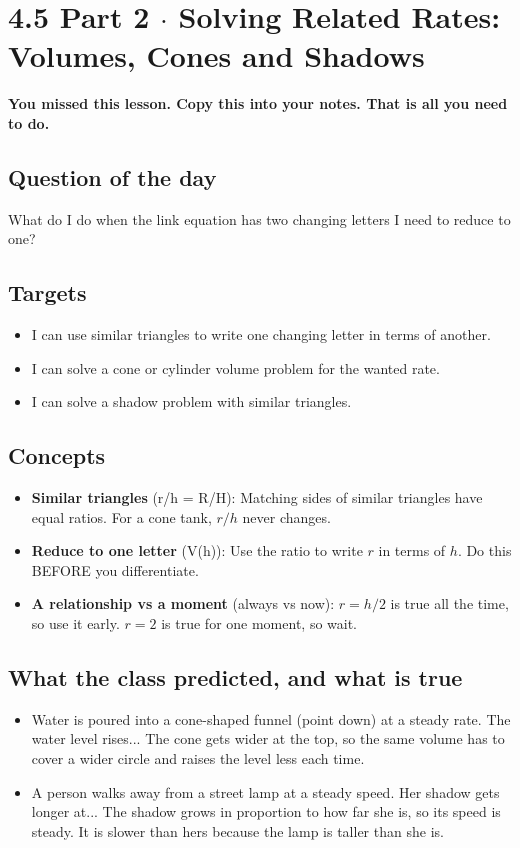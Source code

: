 \documentclass[11pt]{article}
\begin{document}
\section*{4.5 Part 2 $\cdot$ Solving Related Rates: Volumes, Cones and Shadows}
\textbf{You missed this lesson. Copy this into your notes. That is all you need to do.}\par\medskip
\subsection*{Question of the day}
What do I do when the link equation has two changing letters I need to reduce to one?\par
\subsection*{Targets}\begin{itemize}\item I can use similar triangles to write one changing letter in terms of another.
\item I can solve a cone or cylinder volume problem for the wanted rate.
\item I can solve a shadow problem with similar triangles.\end{itemize}
\subsection*{Concepts}\begin{itemize}
\item \textbf{Similar triangles} (r/h = R/H): Matching sides of similar triangles have equal ratios. For a cone tank, $r/h$ never changes.
\item \textbf{Reduce to one letter} (V(h)): Use the ratio to write $r$ in terms of $h$. Do this BEFORE you differentiate.
\item \textbf{A relationship vs a moment} (always vs now): $r=h/2$ is true all the time, so use it early. $r=2$ is true for one moment, so wait.
\end{itemize}
\subsection*{What the class predicted, and what is true}\begin{itemize}
\item Water is poured into a cone-shaped funnel (point down) at a steady rate. The water level rises...  The cone gets wider at the top, so the same volume has to cover a wider circle and raises the level less each time.
\item A person walks away from a street lamp at a steady speed. Her shadow gets longer at...  The shadow grows in proportion to how far she is, so its speed is steady. It is slower than hers because the lamp is taller than she is.
\end{itemize}
\end{document}
